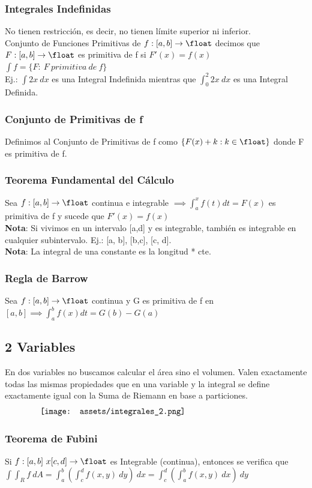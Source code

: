 \documentclass[10pt,a4paper]{article}
\begin{document}
\subsubsection*{Integrales Indefinidas}
No tienen restricción, es decir, no tienen límite superior ni inferior. \\
Conjunto de Funciones Primitivas de $f:[a,b] \rightarrow \float$ decimos que $F:[a,b] \rightarrow \float$ es primitiva de f si $F'(x) = f(x)$ \\
$\int f = \{F: \ F \ primitiva \ de \ f\}$  \\
Ej.: $\int 2x \ dx$ es una Integral Indefinida mientras que $\int^{2}_{0} 2x \ dx$ es una Integral Definida.
\subsubsection*{Conjunto de Primitivas de f}
Definimos al Conjunto de Primitivas de f como $\{F(x) + k: k \in \float\}$ donde F es primitiva de f.
\subsubsection*{Teorema Fundamental del Cálculo}
Sea $f:[a,b] \rightarrow \float$ continua e integrable $\implies \int^{x}_{a}f(t) dt = F(x)$ es primitiva de f y sucede que $F'(x) = f(x)$ \\
\textbf{Nota}: Si vivimos en un intervalo [a,d] y es integrable, también es integrable en cualquier subintervalo. Ej.: [a, b], [b,c], [c, d]. \\
\textbf{Nota}: La integral de una constante es la longitud * cte. 
\subsubsection*{Regla de Barrow}
Sea $f:[a, b] \rightarrow \float$ continua y G es primitiva de f en $[a,b] \implies \int^{b}_{a} f(x) dt = G(b) - G(a)$
\subsection*{2 Variables}
En dos variables no buscamos calcular el área sino el volumen. Valen exactamente todas las mismas propiedades que en una variable y la integral se define exactamente igual con la Suma de Riemann en base a particiones. 
\[\begin{minipage}[b]{0.8\textwidth}
    \texttt{[image: assets/integrales\_2.png]}
\end{minipage}\]
\subsubsection*{Teorema de Fubini}
Si $f:[a,b] \ x [c, d] \rightarrow \float$ es Integrable (continua), entonces se verifica que $\int \int_{R} f \ dA = \int^{b}_{a}(\int^{d}_{c}f(x,y) \ dy) \ dx =  \int^{d}_{c}(\int^{b}_{a}f(x,y) \ dx) \ dy $
\end{document}
